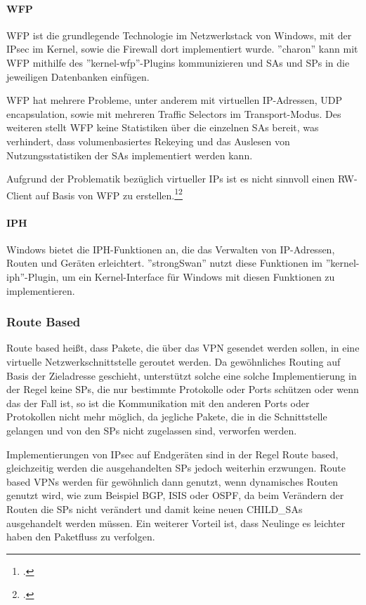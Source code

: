 \paragraph{WFP}
\ac{WFP} ist die grundlegende Technologie im Netzwerkstack von Windows, mit
der \ac{IPsec} im Kernel, sowie die Firewall dort implementiert wurde.
''charon'' kann mit \ac{WFP} mithilfe des ''kernel-wfp''-Plugins kommunizieren
und \acp{SA} und \acp{SP} in die jeweiligen Datenbanken einfügen.

\ac{WFP} hat mehrere Probleme, unter anderem mit virtuellen IP-Adressen,
UDP encapsulation, sowie mit mehreren Traffic Selectors im Transport-Modus.
Des weiteren stellt \ac{WFP} keine Statistiken über die einzelnen \acp{SA} bereit,
was verhindert, dass volumenbasiertes Rekeying und das Auslesen von Nutzungsstatistiken
der \acp{SA} implementiert werden kann.

Aufgrund der Problematik bezüglich virtueller IPs ist es nicht sinnvoll einen \ac{RW}-Client
auf Basis von \ac{WFP} zu erstellen.\footcite[][]{tobias_brunner_kernel-wfp_2014}\footcite[][]{martin_willi_git.strongswan.org_2014}

\paragraph{IPH}
Windows bietet die \ac{IPH}-Funktionen an, die das Verwalten von
\ac{IP}-Adressen, Routen und Geräten erleichtert. ''strongSwan''
nutzt diese Funktionen im ''kernel-iph''-Plugin, um ein Kernel-Interface
für Windows mit diesen Funktionen zu implementieren.


\subsubsection{Route Based}
\label{subsec:routebased}
Route based heißt, dass Pakete, die über das VPN
gesendet werden sollen, in eine virtuelle Netzwerkschnittstelle geroutet werden.
Da gewöhnliches Routing auf Basis der Zieladresse geschieht, unterstützt solche eine solche Implementierung
in der Regel keine \acp{SP}, die nur bestimmte Protokolle oder Ports schützen oder wenn das der Fall ist,
so ist die Kommunikation mit den anderen Ports oder Protokollen nicht mehr möglich,
da jegliche Pakete, die in die Schnittstelle gelangen und von den \acp{SP} nicht zugelassen sind, verworfen werden.

Implementierungen von IPsec auf Endgeräten sind in der Regel Route based, gleichzeitig werden
die ausgehandelten \acp{SP} jedoch weiterhin erzwungen.
Route based \acp{VPN} werden für gewöhnlich dann genutzt, wenn dynamisches Routen genutzt wird,
wie zum Beispiel \ac{BGP}, \ac{ISIS} oder \ac{OSPF}, da beim Verändern der Routen die \acp{SP} nicht verändert
und damit keine neuen CHILD\_SAs ausgehandelt werden müssen. Ein weiterer Vorteil ist, dass Neulinge es leichter haben
den Paketfluss zu verfolgen.

